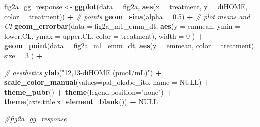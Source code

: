 \documentclass[]{book}
\newenvironment{Shaded}{\begin{snugshade}}{\end{snugshade}}
\newcommand{\CommentTok}[1]{\textcolor[rgb]{0.56,0.35,0.01}{\textit{#1}}}
\newcommand{\DataTypeTok}[1]{\textcolor[rgb]{0.13,0.29,0.53}{#1}}
\newcommand{\DecValTok}[1]{\textcolor[rgb]{0.00,0.00,0.81}{#1}}
\newcommand{\FloatTok}[1]{\textcolor[rgb]{0.00,0.00,0.81}{#1}}
\newcommand{\KeywordTok}[1]{\textcolor[rgb]{0.13,0.29,0.53}{\textbf{#1}}}
\newcommand{\NormalTok}[1]{#1}
\newcommand{\OperatorTok}[1]{\textcolor[rgb]{0.81,0.36,0.00}{\textbf{#1}}}
\newcommand{\OtherTok}[1]{\textcolor[rgb]{0.56,0.35,0.01}{#1}}
\newcommand{\StringTok}[1]{\textcolor[rgb]{0.31,0.60,0.02}{#1}}
\begin{document}
\begin{Shaded}
\begin{Highlighting}[]
\NormalTok{fig2a_gg_response <-}\StringTok{ }\KeywordTok{ggplot}\NormalTok{(}\DataTypeTok{data =}\NormalTok{ fig2a,}
                            \KeywordTok{aes}\NormalTok{(}\DataTypeTok{x =}\NormalTok{ treatment,}
                                \DataTypeTok{y =}\NormalTok{ diHOME,}
                                \DataTypeTok{color =}\NormalTok{ treatment)) }\OperatorTok{+}
\StringTok{  }
\StringTok{  }\CommentTok{# points}
\StringTok{  }\KeywordTok{geom_sina}\NormalTok{(}\DataTypeTok{alpha =} \FloatTok{0.5}\NormalTok{) }\OperatorTok{+}
\StringTok{  }
\StringTok{  }\CommentTok{# plot means and CI}
\StringTok{  }\KeywordTok{geom_errorbar}\NormalTok{(}\DataTypeTok{data =}\NormalTok{ fig2a_m1_emm_dt,}
                \KeywordTok{aes}\NormalTok{(}\DataTypeTok{y =}\NormalTok{ emmean,}
                    \DataTypeTok{ymin =}\NormalTok{ lower.CL,}
                    \DataTypeTok{ymax =}\NormalTok{ upper.CL,}
                    \DataTypeTok{color =}\NormalTok{ treatment),}
                \DataTypeTok{width =} \DecValTok{0}
\NormalTok{  ) }\OperatorTok{+}
\StringTok{  }
\StringTok{  }\KeywordTok{geom_point}\NormalTok{(}\DataTypeTok{data =}\NormalTok{ fig2a_m1_emm_dt,}
             \KeywordTok{aes}\NormalTok{(}\DataTypeTok{y =}\NormalTok{ emmean,}
                 \DataTypeTok{color =}\NormalTok{ treatment),}
             \DataTypeTok{size =} \DecValTok{3}
\NormalTok{  ) }\OperatorTok{+}

\StringTok{  }\CommentTok{# aesthetics}
\StringTok{  }\KeywordTok{ylab}\NormalTok{(}\StringTok{"12,13-diHOME (pmol/mL)"}\NormalTok{) }\OperatorTok{+}
\StringTok{  }\KeywordTok{scale_color_manual}\NormalTok{(}\DataTypeTok{values=}\NormalTok{pal_okabe_ito,}
                     \DataTypeTok{name =} \OtherTok{NULL}\NormalTok{) }\OperatorTok{+}
\StringTok{  }\KeywordTok{theme_pubr}\NormalTok{() }\OperatorTok{+}
\StringTok{  }\KeywordTok{theme}\NormalTok{(}\DataTypeTok{legend.position=}\StringTok{"none"}\NormalTok{) }\OperatorTok{+}
\StringTok{  }\KeywordTok{theme}\NormalTok{(}\DataTypeTok{axis.title.x=}\KeywordTok{element_blank}\NormalTok{()) }\OperatorTok{+}
\StringTok{  }
\StringTok{  }\OtherTok{NULL}

\CommentTok{#fig2a_gg_response}
\end{Highlighting}
\end{Shaded}
\end{document}
